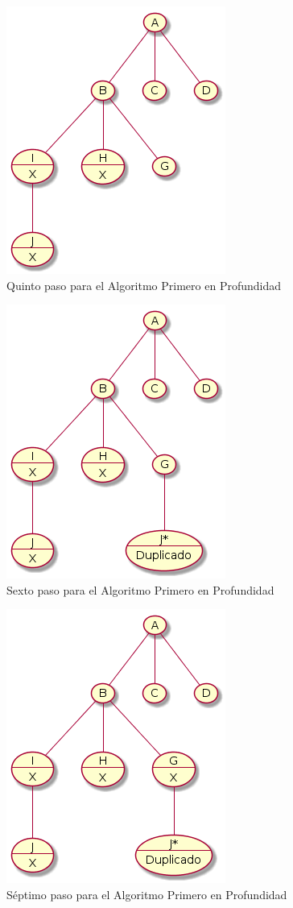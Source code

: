 \documentclass{article}
\begin{document}
\begin{figure}[H]
  \centering
  \includegraphics[width=.4\linewidth]{EJ3/profundidad_004.png}
  \caption{Quinto paso para el Algoritmo Primero en Profundidad}
  \label{gr:g6}
\end{figure}
\begin{figure}[H]
  \centering
  \includegraphics[width=.4\linewidth]{EJ3/profundidad_005.png}
  \caption{Sexto paso para el Algoritmo Primero en Profundidad}
  \label{gr:g7}
\end{figure}
\begin{figure}[H]
  \centering
  \includegraphics[width=.4\linewidth]{EJ3/profundidad_006.png}
  \caption{S\'eptimo paso para el Algoritmo Primero en Profundidad}
  \label{gr:g8}
\end{figure}
\end{document}
